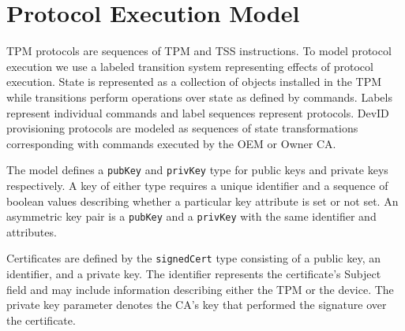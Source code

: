 \documentclass[runningheads]{llncs}
\begin{document}

\section{Protocol Execution Model}

TPM protocols are sequences of TPM and TSS instructions.  To model
protocol execution we use a labeled transition system representing
effects of protocol execution.  State is represented as a collection
of objects installed in the TPM while transitions perform operations
over state as defined by commands.  Labels represent individual
commands and label sequences represent protocols.  DevID provisioning
protocols are modeled as sequences of state transformations
corresponding with commands executed by the OEM or Owner CA.


The model defines a \verb|pubKey| and \verb|privKey| type for public
keys and private keys respectively. A key of either type requires a
unique identifier and a sequence of boolean values describing whether
a particular key attribute is set or not set. An asymmetric key pair is a
\verb|pubKey| and a \verb|privKey| with the same identifier and
attributes.



Certificates are defined by the \verb|signedCert| type consisting of a
public key, an identifier, and a private key. The identifier
represents the certificate's Subject field and may include information
describing either the TPM or the device. The private key parameter
denotes the CA's key that performed the signature over the
certificate.
\end{document}
